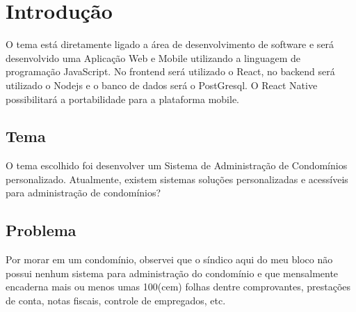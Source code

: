 \chapter{Introdução}
\label{chp:introduction}
O tema está diretamente ligado a área de desenvolvimento de software e será
desenvolvido uma Aplicação Web e Mobile utilizando a linguagem de programação
JavaScript. No frontend será utilizado o React, no backend será utilizado
o Nodejs e o banco de dados será o PostGresql. O React Native possibilitará a 
portabilidade para a plataforma mobile.
\section{Tema}
O tema escolhido foi desenvolver um Sistema de Administração de Condomínios
personalizado. Atualmente, existem sistemas soluções personalizadas e acessíveis
para administração de condomínios?
\section{Problema}
Por morar em um condomínio, observei que o síndico aqui do meu bloco não possui
nenhum sistema para administração do condomínio e que mensalmente encaderna
mais ou menos umas 100(cem) folhas dentre comprovantes, prestações de conta,
notas fiscais, controle de empregados, etc.


